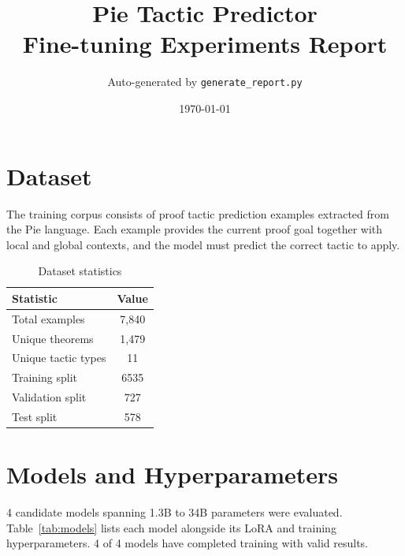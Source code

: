 \documentclass[11pt,a4paper]{article}
\title{\textbf{Pie Tactic Predictor}\\[0.3em]
       \large Fine-tuning Experiments Report}
\author{Auto-generated by \texttt{generate\_report.py}}
\date{\today}
\begin{document}
\maketitle
\tableofcontents
\newpage


\section{Dataset}

The training corpus consists of proof tactic prediction examples extracted from the Pie language. Each example provides the
current proof goal together with local and global contexts, and the model must
predict the correct tactic to apply.

\begin{table}[h]
  \centering
  \caption{Dataset statistics}
  \begin{tabular}{lc}
    \toprule
    \textbf{Statistic}  & \textbf{Value} \\
    \midrule
    Total examples      & 7,840          \\
    Unique theorems     & 1,479          \\
    Unique tactic types & 11             \\
    Training split      & 6535           \\
    Validation split    & 727            \\
    Test split          & 578            \\
    \bottomrule
  \end{tabular}
\end{table}


\section{Models and Hyperparameters}

4 candidate models spanning 1.3B to 34B parameters were evaluated. Table~\ref{tab:models} lists each model alongside its LoRA and training hyperparameters. 4 of 4 models have completed training with valid results.
\end{document}
